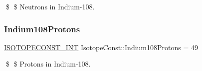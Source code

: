 \$ \$ Neutrons in Indium-\/108. \mbox{\label{group___isotope_const-_indium-_in108_ga1b01530438efdb05eee2129b96b8da7d}} 
\subsubsection{\texorpdfstring{Indium108\+Protons}{Indium108Protons}}
{\footnotesize\ttfamily \mbox{\hyperlink{group___isotope_const-_macros_ga5f18360b3e99483a35c32d789e62621c}{I\+S\+O\+T\+O\+P\+E\+C\+O\+N\+S\+T\+\_\+\+I\+NT}} Isotope\+Const\+::\+Indium108\+Protons = 49}

\$ \$ Protons in Indium-\/108. 